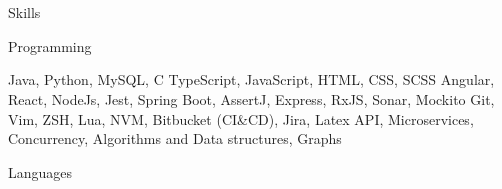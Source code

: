 \section{\faGears}{Skills}

\resumeEntryStart

\resumeEntryTD
{Programming}{}

 {Java, Python, MySQL, C}
 {TypeScript, JavaScript, HTML, CSS, SCSS}
 {Angular, React, NodeJs, Jest, Spring Boot, AssertJ, Express, RxJS, Sonar, Mockito}
 {Git, Vim, ZSH, Lua, NVM, Bitbucket (CI\&CD), Jira, Latex}
 {API, Microservices, Concurrency, Algorithms and Data structures, Graphs}

\resumeEntryEnd

\resumeEntryStart

\resumeEntryTD
{Languages}{}


\resumeEntryEnd
